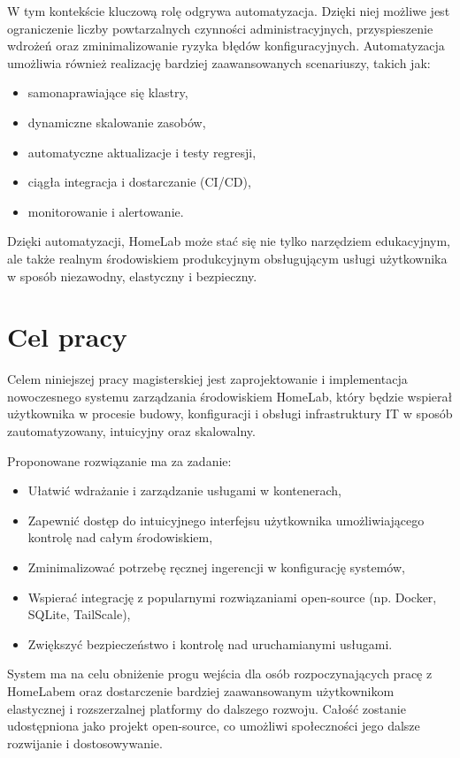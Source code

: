 W tym kontekście kluczową rolę odgrywa automatyzacja. Dzięki niej możliwe jest ograniczenie liczby powtarzalnych czynności administracyjnych, przyspieszenie wdrożeń oraz zminimalizowanie ryzyka błędów konfiguracyjnych. Automatyzacja umożliwia również realizację bardziej zaawansowanych scenariuszy, takich jak:
\begin{itemize}
    \item samonaprawiające się klastry,
    \item dynamiczne skalowanie zasobów,
    \item automatyczne aktualizacje i testy regresji,
    \item ciągła integracja i dostarczanie (CI/CD),
    \item monitorowanie i alertowanie.
\end{itemize}

Dzięki automatyzacji, HomeLab może stać się nie tylko narzędziem edukacyjnym, ale także realnym środowiskiem produkcyjnym obsługującym usługi użytkownika w sposób niezawodny, elastyczny i bezpieczny.

\section{Cel pracy}

Celem niniejszej pracy magisterskiej jest zaprojektowanie i implementacja nowoczesnego systemu zarządzania środowiskiem HomeLab, który będzie wspierał użytkownika w procesie budowy, konfiguracji i obsługi infrastruktury IT w sposób zautomatyzowany, intuicyjny oraz skalowalny. 

Proponowane rozwiązanie ma za zadanie:
\begin{itemize}
    \item Ułatwić wdrażanie i zarządzanie usługami w kontenerach,
    \item Zapewnić dostęp do intuicyjnego interfejsu użytkownika umożliwiającego kontrolę nad całym środowiskiem,
    \item Zminimalizować potrzebę ręcznej ingerencji w konfigurację systemów,
    \item Wspierać integrację z popularnymi rozwiązaniami open-source (np. Docker, SQLite, TailScale),
    \item Zwiększyć bezpieczeństwo i kontrolę nad uruchamianymi usługami.
\end{itemize}

System ma na celu obniżenie progu wejścia dla osób rozpoczynających pracę z HomeLabem oraz dostarczenie bardziej zaawansowanym użytkownikom elastycznej i rozszerzalnej platformy do dalszego rozwoju. Całość zostanie udostępniona jako projekt open-source, co umożliwi społeczności jego dalsze rozwijanie i dostosowywanie.

